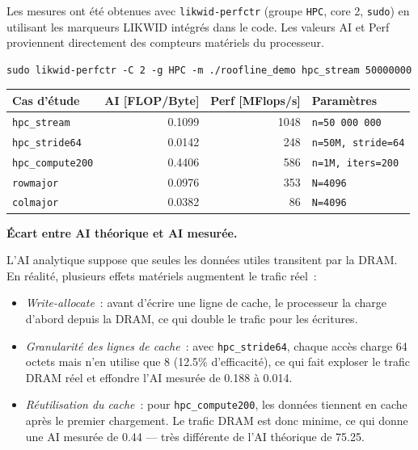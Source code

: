 \documentclass[a4paper,12pt]{article}
\begin{document}
Les mesures ont été obtenues avec \texttt{likwid-perfctr} (groupe \texttt{HPC}, core 2,
\texttt{sudo}) en utilisant les marqueurs LIKWID intégrés dans le code. Les valeurs AI et
Perf proviennent directement des compteurs matériels du processeur.

\begin{verbatim}
sudo likwid-perfctr -C 2 -g HPC -m ./roofline_demo hpc_stream 50000000
\end{verbatim}

\begin{center}
\begin{tabular}{lrrl}
    \toprule
    \textbf{Cas d'étude} & \textbf{AI [FLOP/Byte]} & \textbf{Perf [MFlops/s]} & \textbf{Paramètres} \\
    \midrule
    \texttt{hpc\_stream}         & 0.1099 & 1048 & \texttt{n=50\,000\,000} \\
    \texttt{hpc\_stride64}       & 0.0142 &  248 & \texttt{n=50M, stride=64} \\
    \texttt{hpc\_compute200}     & 0.4406 &  586 & \texttt{n=1M, iters=200} \\
    \texttt{rowmajor}            & 0.0976 &  353 & \texttt{N=4096} \\
    \texttt{colmajor}            & 0.0382 &   86 & \texttt{N=4096} \\
    \bottomrule
\end{tabular}
\end{center}

\textbf{Écart entre AI théorique et AI mesurée.}

L'AI analytique suppose que seules les données utiles transitent par la DRAM. En réalité,
plusieurs effets matériels augmentent le trafic réel~:
\begin{itemize}
    \item \textit{Write-allocate}~: avant d'écrire une ligne de cache, le processeur la charge
    d'abord depuis la DRAM, ce qui double le trafic pour les écritures.
    \item \textit{Granularité des lignes de cache}~: avec \texttt{hpc\_stride64}, chaque accès
    charge 64 octets mais n'en utilise que 8 (12.5\% d'efficacité), ce qui fait exploser le
    trafic DRAM réel et effondre l'AI mesurée de 0.188 à 0.014.
    \item \textit{Réutilisation du cache}~: pour \texttt{hpc\_compute200}, les données tiennent
    en cache après le premier chargement. Le trafic DRAM est donc minime, ce qui donne une AI
    mesurée de 0.44 — très différente de l'AI théorique de 75.25.
\end{itemize}
\end{document}
